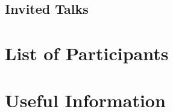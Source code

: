 \documentclass[openany, parskip=full, 12pt, a4]{scrbook}
\begin{document}


\section{Invited Talks}



\chapter{List of Participants}
 

 
\chapter{Useful Information}





\pagecolor{myblue}
\thispagestyle{empty}
\mbox{}
\end{document}
